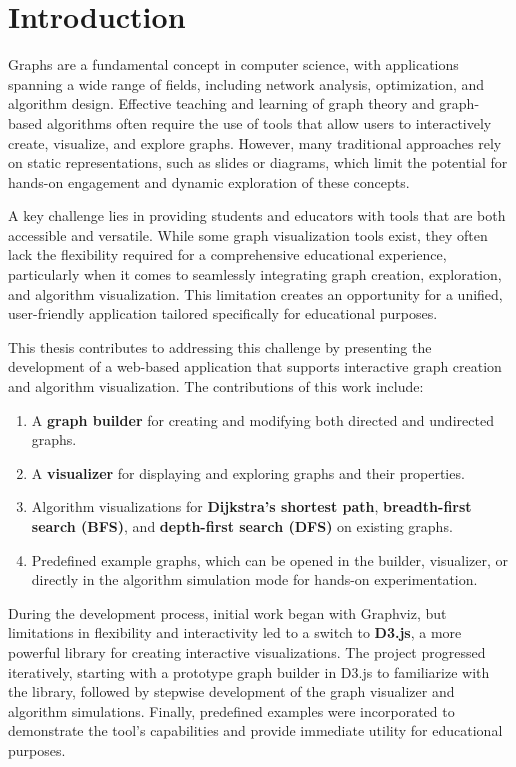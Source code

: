 \section{Introduction}
\label{sec:introduction}
Graphs are a fundamental concept in computer science, with applications spanning a wide range of fields, including network analysis, optimization, and algorithm design. Effective teaching and learning of graph theory and graph-based algorithms often require the use of tools that allow users to interactively create, visualize, and explore graphs. However, many traditional approaches rely on static representations, such as slides or diagrams, which limit the potential for hands-on engagement and dynamic exploration of these concepts.

A key challenge lies in providing students and educators with tools that are both accessible and versatile. While some graph visualization tools exist, they often lack the flexibility required for a comprehensive educational experience, particularly when it comes to seamlessly integrating graph creation, exploration, and algorithm visualization. This limitation creates an opportunity for a unified, user-friendly application tailored specifically for educational purposes.

This thesis contributes to addressing this challenge by presenting the development of a web-based application that supports interactive graph creation and algorithm visualization. The contributions of this work include:
\begin{enumerate}
    \item A \textbf{graph builder} for creating and modifying both directed and undirected graphs.
    \item A \textbf{visualizer} for displaying and exploring graphs and their properties.
    \item Algorithm visualizations for \textbf{Dijkstra’s shortest path}, \textbf{breadth-first search (BFS)}, and \textbf{depth-first search (DFS)} on existing graphs.
    \item Predefined example graphs, which can be opened in the builder, visualizer, or directly in the algorithm simulation mode for hands-on experimentation.
\end{enumerate}

During the development process, initial work began with Graphviz, but limitations in flexibility and interactivity led to a switch to \textbf{D3.js}, a more powerful library for creating interactive visualizations. The project progressed iteratively, starting with a prototype graph builder in D3.js to familiarize with the library, followed by stepwise development of the graph visualizer and algorithm simulations. Finally, predefined examples were incorporated to demonstrate the tool’s capabilities and provide immediate utility for educational purposes.

